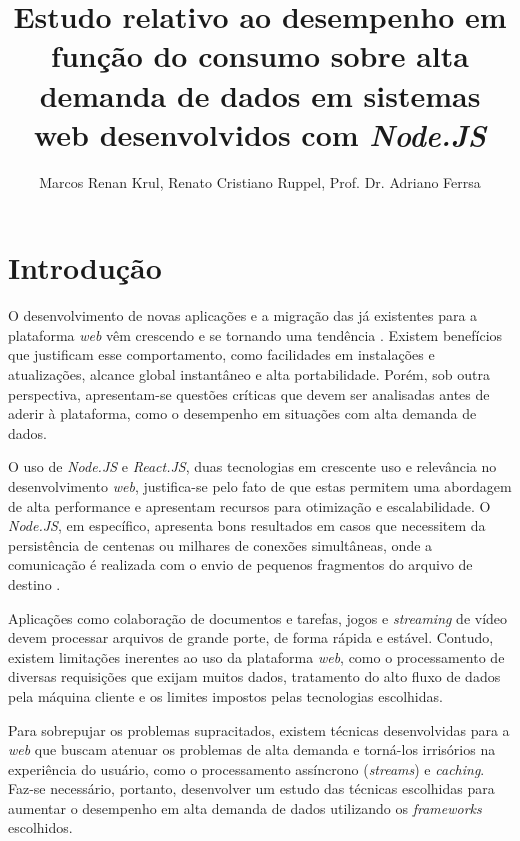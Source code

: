 \documentclass[12pt]{article}
\title{Estudo relativo ao desempenho em função do consumo sobre alta demanda de dados em sistemas web desenvolvidos com \textit{Node.JS}}
\author{Marcos Renan Krul\inst{1}, Renato Cristiano Ruppel\inst{1}, Prof. Dr. Adriano Ferrsa\inst{1}}
\begin{document}
 

\maketitle


\begin{resumo} 
\end{resumo}


\begin{abstract} 
\end{abstract}


\section{Introdução}

O desenvolvimento de novas aplicações e a migração das já existentes para a plataforma \textit{web} 
vêm crescendo e se tornando uma tendência \cite{SOUZAB}. Existem benefícios que justificam esse comportamento,
como facilidades em instalações e atualizações, alcance global instantâneo e alta portabilidade. Porém,
sob outra perspectiva, apresentam-se questões críticas que devem ser analisadas antes de aderir à plataforma, como
o desempenho em situações com alta demanda de dados.

O uso de \textit{Node.JS} e \textit{React.JS}, duas tecnologias em crescente uso e relevância no
desenvolvimento \textit{web}, justifica-se pelo fato de que estas permitem uma abordagem de alta
performance e apresentam recursos para otimização e escalabilidade. O \textit{Node.JS}, em específico, apresenta
bons resultados em casos que necessitem da persistência de centenas ou milhares de conexões
simultâneas, onde a comunicação é realizada com o envio de pequenos fragmentos do arquivo de destino
\cite[p. 112]{EJSMONT}.

Aplicações como colaboração de documentos e tarefas, jogos e \textit{streaming} de vídeo \cite{ZRHR} devem processar 
arquivos de grande porte, de forma rápida e estável. Contudo, existem limitações inerentes ao uso da 
plataforma \textit{web}, como o processamento de diversas requisições que exijam muitos dados, 
tratamento do alto fluxo de dados pela máquina cliente e os limites impostos pelas tecnologias escolhidas.

Para sobrepujar os problemas supracitados, existem técnicas desenvolvidas para a \textit{web} que buscam
atenuar os problemas de alta demanda e torná-los irrisórios na experiência do usuário, como o processamento
assíncrono (\textit{streams}) e \textit{caching}. Faz-se necessário, portanto, desenvolver um estudo das 
técnicas escolhidas para aumentar o desempenho em alta demanda de dados utilizando os \textit{frameworks} 
escolhidos.
\end{document}

